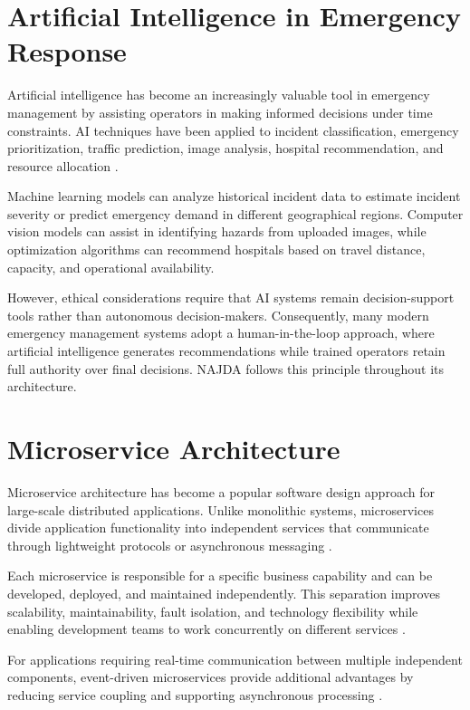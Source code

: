 \section{Artificial Intelligence in Emergency Response}

Artificial intelligence has become an increasingly valuable tool in emergency management by assisting operators in making informed decisions under time constraints. AI techniques have been applied to incident classification, emergency prioritization, traffic prediction, image analysis, hospital recommendation, and resource allocation \cite{xgboost,mobilenetv2}.

Machine learning models can analyze historical incident data to estimate incident severity or predict emergency demand in different geographical regions. Computer vision models can assist in identifying hazards from uploaded images, while optimization algorithms can recommend hospitals based on travel distance, capacity, and operational availability.

However, ethical considerations require that AI systems remain decision-support tools rather than autonomous decision-makers. Consequently, many modern emergency management systems adopt a human-in-the-loop approach, where artificial intelligence generates recommendations while trained operators retain full authority over final decisions. NAJDA follows this principle throughout its architecture.

\section{Microservice Architecture}

Microservice architecture has become a popular software design approach for large-scale distributed applications. Unlike monolithic systems, microservices divide application functionality into independent services that communicate through lightweight protocols or asynchronous messaging \cite{newman2021microservices,richardson2018microservices}.

Each microservice is responsible for a specific business capability and can be developed, deployed, and maintained independently. This separation improves scalability, maintainability, fault isolation, and technology flexibility while enabling development teams to work concurrently on different services \cite{bass2022software,newman2021microservices}.

For applications requiring real-time communication between multiple independent components, event-driven microservices provide additional advantages by reducing service coupling and supporting asynchronous processing \cite{richardson2018microservices}.

